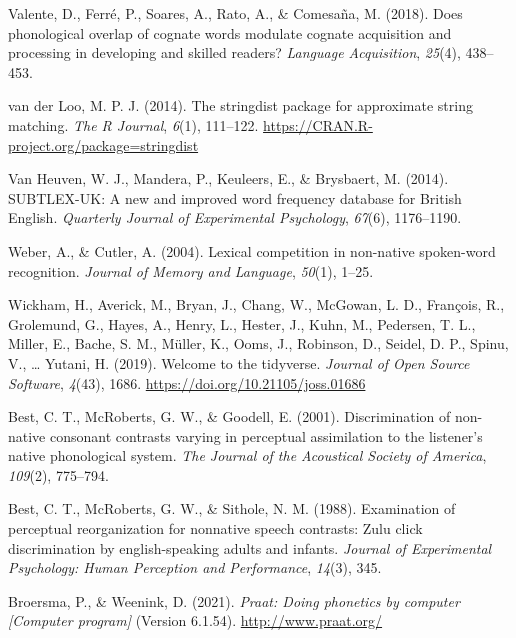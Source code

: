 \documentclass[
]{article}
\newlength{\cslhangindent}
\newenvironment{CSLReferences}[2] %
 {\begin{list}{}{%
  \setlength{\itemindent}{0pt}
  \setlength{\leftmargin}{0pt}
  \setlength{\parsep}{0pt}
  \ifodd #1
   \setlength{\leftmargin}{\cslhangindent}
   \setlength{\itemindent}{-1\cslhangindent}
  \fi
  \setlength{\itemsep}{#2\baselineskip}}}
 {\end{list}}
\begin{document}
\begin{CSLReferences}{1}{0}
Valente, D., Ferré, P., Soares, A., Rato, A., \& Comesaña, M. (2018).
Does phonological overlap of cognate words modulate cognate acquisition
and processing in developing and skilled readers? \emph{Language
Acquisition}, \emph{25}(4), 438--453.

van der Loo, M. P. J. (2014). The stringdist package for approximate
string matching. \emph{The R Journal}, \emph{6}(1), 111--122.
\url{https://CRAN.R-project.org/package=stringdist}

Van Heuven, W. J., Mandera, P., Keuleers, E., \& Brysbaert, M. (2014).
{SUBTLEX-UK}: {A} new and improved word frequency database for {British
English}. \emph{Quarterly Journal of Experimental Psychology},
\emph{67}(6), 1176--1190.

Weber, A., \& Cutler, A. (2004). Lexical competition in non-native
spoken-word recognition. \emph{Journal of Memory and Language},
\emph{50}(1), 1--25.

Wickham, H., Averick, M., Bryan, J., Chang, W., McGowan, L. D.,
François, R., Grolemund, G., Hayes, A., Henry, L., Hester, J., Kuhn, M.,
Pedersen, T. L., Miller, E., Bache, S. M., Müller, K., Ooms, J.,
Robinson, D., Seidel, D. P., Spinu, V., \ldots{} Yutani, H. (2019).
Welcome to the tidyverse. \emph{Journal of Open Source Software},
\emph{4}(43), 1686. \url{https://doi.org/10.21105/joss.01686}

Best, C. T., McRoberts, G. W., \& Goodell, E. (2001). Discrimination of
non-native consonant contrasts varying in perceptual assimilation to the
listener's native phonological system. \emph{The Journal of the
Acoustical Society of America}, \emph{109}(2), 775--794.

Best, C. T., McRoberts, G. W., \& Sithole, N. M. (1988). Examination of
perceptual reorganization for nonnative speech contrasts: Zulu click
discrimination by english-speaking adults and infants. \emph{Journal of
Experimental Psychology: Human Perception and Performance},
\emph{14}(3), 345.

Broersma, P., \& Weenink, D. (2021). \emph{Praat: Doing phonetics by
computer {[}{Computer} program{]}} (Version 6.1.54).
\url{http://www.praat.org/}


\end{CSLReferences}
\end{document}
